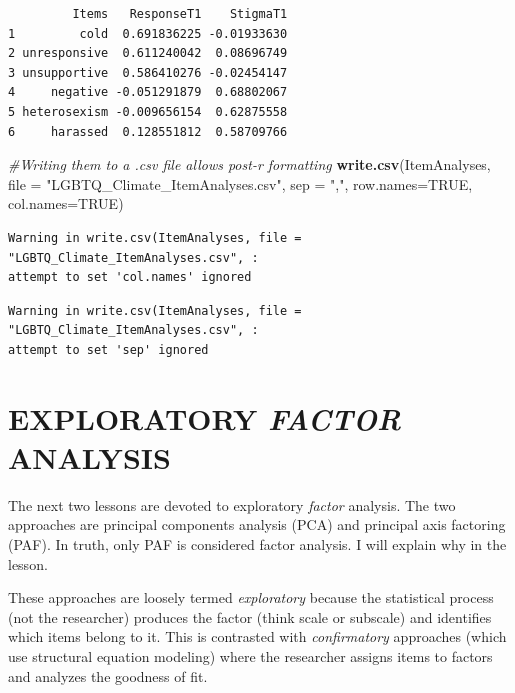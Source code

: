 \documentclass[
  english,
]{book}
\newenvironment{Shaded}{\begin{snugshade}}{\end{snugshade}}
\newcommand{\CommentTok}[1]{\textcolor[rgb]{0.56,0.35,0.01}{\textit{#1}}}
\newcommand{\DataTypeTok}[1]{\textcolor[rgb]{0.13,0.29,0.53}{#1}}
\newcommand{\KeywordTok}[1]{\textcolor[rgb]{0.13,0.29,0.53}{\textbf{#1}}}
\newcommand{\NormalTok}[1]{#1}
\newcommand{\OtherTok}[1]{\textcolor[rgb]{0.56,0.35,0.01}{#1}}
\newcommand{\StringTok}[1]{\textcolor[rgb]{0.31,0.60,0.02}{#1}}
\begin{document}
\begin{verbatim}
         Items   ResponseT1    StigmaT1
1         cold  0.691836225 -0.01933630
2 unresponsive  0.611240042  0.08696749
3 unsupportive  0.586410276 -0.02454147
4     negative -0.051291879  0.68802067
5 heterosexism -0.009656154  0.62875558
6     harassed  0.128551812  0.58709766
\end{verbatim}

\begin{Shaded}
\begin{Highlighting}[]
\CommentTok{#Writing them to a .csv file allows post-r formatting}
\KeywordTok{write.csv}\NormalTok{(ItemAnalyses, }\DataTypeTok{file =} \StringTok{"LGBTQ_Climate_ItemAnalyses.csv"}\NormalTok{, }\DataTypeTok{sep =} \StringTok{","}\NormalTok{, }\DataTypeTok{row.names=}\OtherTok{TRUE}\NormalTok{, }\DataTypeTok{col.names=}\OtherTok{TRUE}\NormalTok{)}
\end{Highlighting}
\end{Shaded}

\begin{verbatim}
Warning in write.csv(ItemAnalyses, file = "LGBTQ_Climate_ItemAnalyses.csv", :
attempt to set 'col.names' ignored
\end{verbatim}

\begin{verbatim}
Warning in write.csv(ItemAnalyses, file = "LGBTQ_Climate_ItemAnalyses.csv", :
attempt to set 'sep' ignored
\end{verbatim}

\hypertarget{exploratory-factor-analysis-1}{%
\chapter*{\texorpdfstring{EXPLORATORY \emph{FACTOR} ANALYSIS}{EXPLORATORY FACTOR ANALYSIS}}\label{exploratory-factor-analysis-1}}

The next two lessons are devoted to exploratory \emph{factor} analysis. The two approaches are principal components analysis (PCA) and principal axis factoring (PAF). In truth, only PAF is considered factor analysis. I will explain why in the lesson.

These approaches are loosely termed \emph{exploratory} because the statistical process (not the researcher) produces the factor (think scale or subscale) and identifies which items belong to it. This is contrasted with \emph{confirmatory} approaches (which use structural equation modeling) where the researcher assigns items to factors and analyzes the goodness of fit.
\end{document}
